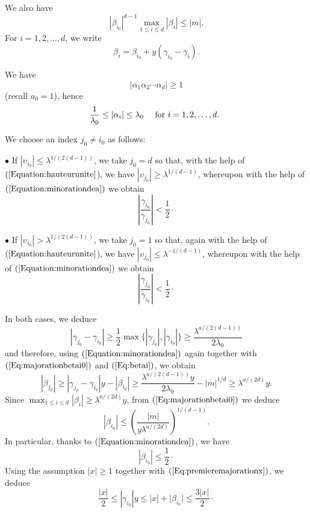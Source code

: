 \documentclass[leqno,11pt]{article}
\begin{document}
We also have
\begin{equation}\label{Eq:majorationbetai0}
|\beta_{i_0}|^{d-1}\max_{1\le i\le d} |\beta_i|\le |m|.
\end{equation}
For $i=1,2,\dots,d$, we write 
\begin{equation}\label{Eq:betai}
\beta_i=\beta_{i_0}+y(\gamma_{i_0}-\gamma_i).
\end{equation}

We have
$$
|\alpha_1\alpha_2\cdots\alpha_d|\ge 1
$$
(recall $a_0=1$), 
hence
$$
\frac{1}{\lambda_0 }\le |\alpha_i|\le \lambda_0
\quad\hbox{
for $i=1,2,\dots,d$. }
$$

We choose an index $j_0\not=i_0$ as follows: 

$\bullet$
If $|\upsilon_{i_0}|\le \lambda^{1/(2(d-1))}$, we take $j_0=d$ so that, with the help of $(\ref{Equation:hauteurunite}$), we have $|\upsilon_{j_0}|\ge \lambda^{1/(d-1)}$, whereupon with the help of $(\ref{Equation:minorationdea})$ we obtain
$$
\left|
\frac{\gamma_{i_0}}{\gamma_{j_0}}
\right|<\frac{1}{2}\cdotp
$$

$\bullet$
If $|\upsilon_{i_0}|> \lambda^{1/(2(d-1))}$, we take $j_0=1$ so that, again with the help of $(\ref{Equation:hauteurunite}$), we have $|\upsilon_{j_0}|\le \lambda^{-1/(d-1)}$, whereupon with the help of $(\ref{Equation:minorationdea})$ we obtain
$$
\left|
\frac{\gamma_{j_0}}{\gamma_{i_0}}
\right|<\frac{1}{2}\cdotp
$$

In both cases, we deduce 
$$
|\gamma_{j_0}-\gamma_{i_0} | \ge
\frac{1}{2}\max
\{
|\gamma_{j_0}|, |\gamma_{i_0} | 
\}
\ge \frac{\lambda^{a/(2(d-1))}}{2\lambda_0 }
$$
and therefore, using $(\ref{Equation:minorationdea})$ again together with $(\ref{Eq:majorationbetai0})$ and $(\ref{Eq:betai})$, we obtain 
$$
|\beta_{j_0}|\ge 
|\gamma_{j_0} -\gamma_{i_0} | y -|\beta_{i_0}| \ge
\frac{\lambda^{a/(2(d-1))}y} {2\lambda_0} -|m|^{1/d} \ge
\lambda^{a/(2d)} y.
$$
Since $\displaystyle\max_{1\leq i\leq d} |\beta_i| \geq \lambda^{a/(2d)} y$, from 
$(\ref{Eq:majorationbetai0})$ we deduce 
\begin{equation}\label{Eq:step1a}
|\beta_{i_0}|\le \left(\frac{|m|}{y \lambda^{a/(2d)}}\right)^ {1/(d-1)}.
\end{equation} 
In particular, thanks to $(\ref{Equation:minorationdea})$, we have 
\begin{equation}\label{Eq:betoi0le12}
|\beta_{i_0}|\le \frac{1}{2}\cdotp
\end{equation}
Using the assumption $|x|\ge 1$ together with $(\ref{Eq:premieremajorationx})$, we deduce 
\begin{equation}\label{Eq:minorationalphai0}
\frac{|x|}{2} \leq |\gamma_{i_0}| y \leq |x]+|\beta_{i_0}| \leq \frac{3|x|}{2} 
\cdotp
\end{equation}
\par
\end{document}
